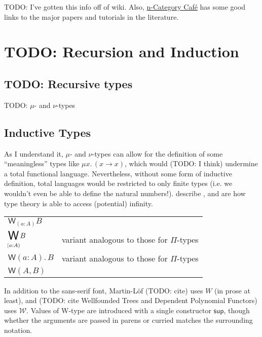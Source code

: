 \documentclass[11pt]{article} %
\theoremstyle{definition}
\theoremstyle{remark}
\begin{document}
TODO: I've gotten this info off of wiki.
Also, \href{https://golem.ph.utexas.edu/category/2006/08/cartesian_closed_categories_an_1.html}{n-Category Caf\'e} has some good links to the major papers and tutorials in the literature.


\section{TODO: Recursion and Induction}
\label{sec:ind-types}
\subsection{TODO: Recursive types}
TODO: $\mu$- and $\nu$-types

\subsection{Inductive Types}

As I understand it, $\mu$- and $\nu$-types can allow for the definition of some ``meaningless'' types like $\mu x.\,(x \to x)$, which would (TODO: I think) undermine a total functional language.
Nevertheless, without some form of inductive definition, total languages would be restricted to only finite types (i.e. we wouldn't even be able to define the natural numbers!).
 describe , and are how type theory is able to access (potential) infinity.
\begin{center}
\renewcommand{\arraystretch}{1.2}
\begin{tabular}{lp{10cm}}
$\mathsf W_{(a:A)}B$ & \cite{hottbook} \\
$\displaystyle \mathop{\vphantom{\prod}\textsf{\raisebox{-0.5ex}{\LARGE W}}}_{\mathclap{(a:A)}}B$ & variant analogous to those for $\Pi$-types \\
$\mathsf W(a:A).\,B$ & variant analogous to those for $\Pi$-types \\
$\mathsf W(A,B)$ & \cite{petersson-synek_1989} \\
\end{tabular}
\end{center}
In addition to the sans-serif font, Martin-L\"of (TODO: cite) uses $W$ (in prose at least), and (TODO: cite Wellfounded Trees and Dependent Polynomial Functors) uses $\mathcal W$.
Values of W-type are introduced with a single constructor $\mathsf{sup}$, though whether the arguments are passed in parens or curried matches the surrounding notation.
\end{document}
